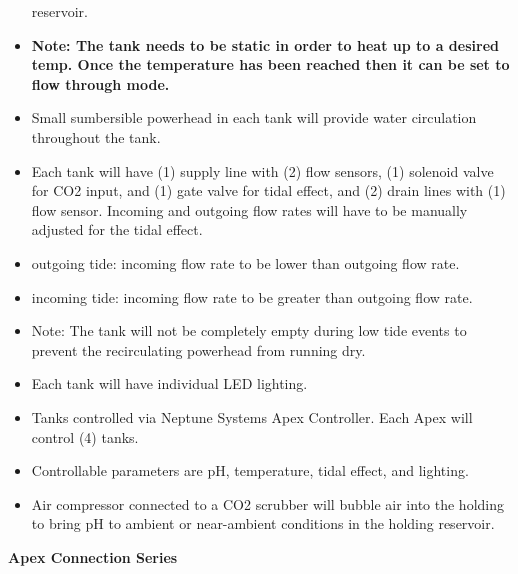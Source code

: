 \documentclass[]{book}
\begin{document}
\begin{itemize}
  reservoir.\\
\item
  \textbf{Note: The tank needs to be static in order to heat up to a
  desired temp. Once the temperature has been reached then it can be set
  to flow through mode.}\\
\item
  Small sumbersible powerhead in each tank will provide water
  circulation throughout the tank.\\
\item
  Each tank will have (1) supply line with (2) flow sensors, (1)
  solenoid valve for CO2 input, and (1) gate valve for tidal effect, and
  (2) drain lines with (1) flow sensor. Incoming and outgoing flow rates
  will have to be manually adjusted for the tidal effect.\\
\item
  outgoing tide: incoming flow rate to be lower than outgoing flow
  rate.\\
\item
  incoming tide: incoming flow rate to be greater than outgoing flow
  rate.\\
\item
  Note: The tank will not be completely empty during low tide events to
  prevent the recirculating powerhead from running dry.\\
\item
  Each tank will have individual LED lighting.\\
\item
  Tanks controlled via Neptune Systems Apex Controller. Each Apex will
  control (4) tanks.\\
\item
  Controllable parameters are pH, temperature, tidal effect, and
  lighting.\\
\item
  Air compressor connected to a CO2 scrubber will bubble air into the
  holding to bring pH to ambient or near-ambient conditions in the
  holding reservoir.
\end{itemize}

 \textbf{Apex Connection Series}
\end{document}
